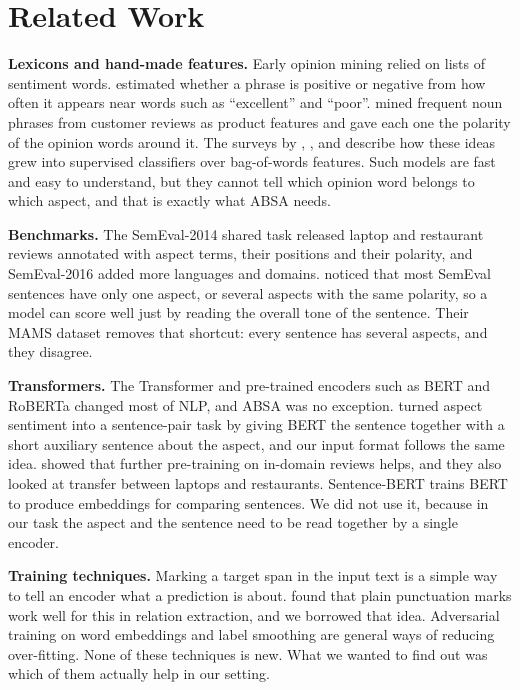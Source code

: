 \documentclass[11pt]{article}
\begin{document}
\section{Related Work}
\textbf{Lexicons and hand-made features.} Early opinion mining relied on lists of sentiment words. \citet{turney2002thumbs} estimated whether a phrase is positive or negative from how often it appears near words such as ``excellent'' and ``poor''. \citet{hu2004mining} mined frequent noun phrases from customer reviews as product features and gave each one the polarity of the opinion words around it. The surveys by \citet{pang2008opinion}, \citet{liu2012sentiment}, \citet{liu2015sentiment} and \citet{medhat2014sentiment} describe how these ideas grew into supervised classifiers over bag-of-words features. Such models are fast and easy to understand, but they cannot tell which opinion word belongs to which aspect, and that is exactly what ABSA needs.

\textbf{Benchmarks.} The SemEval-2014 shared task \citep{pontiki2014semeval} released laptop and restaurant reviews annotated with aspect terms, their positions and their polarity, and SemEval-2016 \citep{pontiki2016semeval} added more languages and domains. \citet{jiang2019mams} noticed that most SemEval sentences have only one aspect, or several aspects with the same polarity, so a model can score well just by reading the overall tone of the sentence. Their MAMS dataset removes that shortcut: every sentence has several aspects, and they disagree.

\textbf{Transformers.} The Transformer \citep{vaswani2017attention} and pre-trained encoders such as BERT \citep{devlin2019bert} and RoBERTa \citep{liu2019roberta} changed most of NLP, and ABSA was no exception. \citet{sun2019utilizing} turned aspect sentiment into a sentence-pair task by giving BERT the sentence together with a short auxiliary sentence about the aspect, and our input format follows the same idea. \citet{rietzler2020adapt} showed that further pre-training on in-domain reviews helps, and they also looked at transfer between laptops and restaurants. Sentence-BERT \citep{reimers2019sentence} trains BERT to produce embeddings for comparing sentences. We did not use it, because in our task the aspect and the sentence need to be read together by a single encoder.

\textbf{Training techniques.} Marking a target span in the input text is a simple way to tell an encoder what a prediction is about. \citet{zhou2022improved} found that plain punctuation marks work well for this in relation extraction, and we borrowed that idea. Adversarial training on word embeddings \citep{miyato2017adversarial} and label smoothing \citep{szegedy2016rethinking} are general ways of reducing over-fitting. None of these techniques is new. What we wanted to find out was which of them actually help in our setting.
\end{document}
